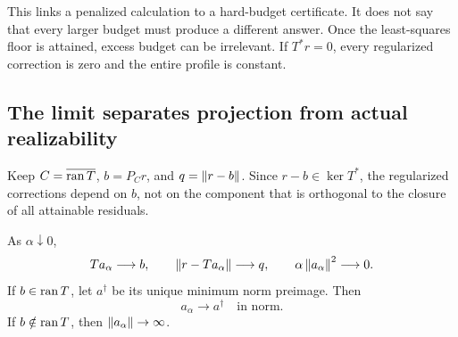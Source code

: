 This links a penalized calculation to a hard-budget certificate. It does not say that every larger budget must produce a different answer. Once the least-squares floor is attained, excess budget can be irrelevant. If $T^*r=0$, every regularized correction is zero and the entire profile is constant.

\subsection{The limit separates projection from actual realizability}
Keep $C=\overline{\operatorname{ran} T}$, $b=P_Cr$, and $q=\left\lVert r-b\right\rVert$. Since $r-b\in\ker T^*$, the regularized corrections depend on $b$, not on the component that is orthogonal to the closure of all attainable residuals.

\begin{KStheorem}\label{KS:WR08}
As $\alpha\downarrow0$,
\[
 Ta_\alpha\longrightarrow b,\qquad
 \left\lVert r-Ta_\alpha\right\rVert\longrightarrow q,\qquad
 \alpha\left\lVert a_\alpha\right\rVert^2\longrightarrow0.
\]
If $b\in\operatorname{ran} T$, let $a^\dagger$ be its unique minimum norm preimage. Then
\[
 a_\alpha\longrightarrow a^\dagger\quad\text{in norm}.
\]
If $b\notin\operatorname{ran} T$, then $\left\lVert a_\alpha\right\rVert\to\infty$.
\end{KStheorem}

